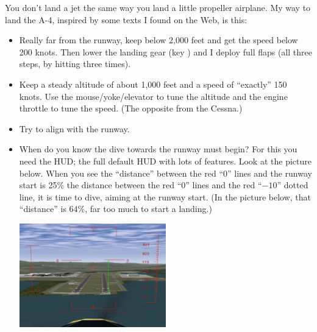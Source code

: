 You don't land a jet the same way you land a little propeller airplane.
My way to land the A-4, inspired by some texts I found on the Web, is
this:
\begin{itemize}
	\item Really far from the runway, keep below 2,000 feet and get the speed below 200 knots. Then lower the landing gear (key ) and I deploy full flaps (all three steps, by hitting \key{]} three times).
	\item Keep a steady altitude of about 1,000 feet and a speed of ``exactly'' 150 knots. Use the mouse/yoke/elevator to tune the altitude and the engine throttle to tune the speed. (The opposite from the Cessna.)
	\item Try to align with the runway.
	\item When do you know the dive towards the runway must begin? For this you need the  HUD; the full default HUD with lots of features. Look at the picture below. When you see the ``distance'' between the red ``0'' lines and the runway start is 25\% the distance between the red ``0'' lines and the red ``$-10$'' dotted line, it is time to dive, aiming at the runway start. (In the picture below, that ``distance'' is 64\%, far too much to start a landing.)


\begin{center}
\includegraphics[width=0.5\textwidth]{img/tut_54}
\end{center}


\end{itemize}

